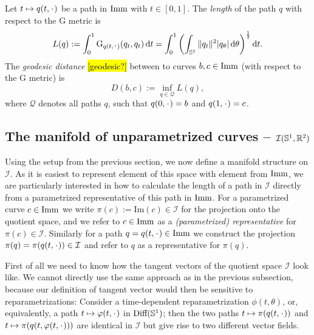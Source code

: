 \begin{definition}
  \label{def:length-in-imm}
  Let $t \mapsto q(t,\blank)$ be a path in $\I$ with $t \in [0,1]$. The \textit{length} of the path $q$ with respect to the $\mathrm{G}$ metric  is
  \begin{equation*}
    L(q) := \int_{0}^{1} \mathrm{G}_{q(t,\blank)}(q_t,q_t) \diff t =
    \int_{0}^{1}
    \left(
      \int_{\S^{1}} \|q_t\|^2 |q_{\theta}| \diff \theta
    \right)^{\frac{1}{2}}
    \diff t.
  \end{equation*}
  The \textit{geodesic distance} \hl{[geodesic?]} between to curves $b,c \in \I$ (with respect to the $\mathrm{G}$ metric) is
  \begin{equation*}
    D(b,c) := \inf_{q \in \mathcal{Q}} L(q),
  \end{equation*}
  where $\mathcal{Q}$ denotes all paths $q$, such that $q(0,\blank)=b$ and $q(1,\blank)=c$.
\end{definition}


\subsection{The manifold of unparametrized curves -- $\mathcal{I}(\S^1, \R^2)$}
\label{sec:manif-unpar-curv}

Using the setup from the previous section, we now define a manifold structure on $\mathcal{I}$. As it is easiest to represent element of this space with element from $\I$, we are particularly interested in how to calculate the length of a path in $\mathcal{I}$ directly from a parametrized representative of this path in $\I$. For a parametrized curve $c \in \I$ we write $\pi(c) := \mathrm{Im}(c)\in \mathcal{I}$ for the projection onto the quotient space, and we refer to $c\in\I$ as a \textit{(parametrized) representative} for $\pi(c) \in \mathcal{I}$. Similarly for a path $q = q(t, \blank) \in \I$ we construct the projection $\pi(q) = \pi(q(t,\blank)) \in \mathcal{I}$ and refer to $q$ as a representative for $\pi(q)$.

First of all we need to know how the tangent vectors of the quotient space $\mathcal{I}$ look like. We cannot directly use the same approach as in the previous subsection, because our definition of tangent vector would then be
sensitive to reparametrizations: Consider a time-dependent
reparametrization $\phi(t,\theta)$, or, equivalently, a path $t \mapsto \phi(t,
\blank)$ in $\text{Diff}(\S^1)$; then the two paths $t \mapsto
\pi(q(t, \blank))$ and $t \mapsto \pi(q(t, \phi(t, \blank)))$ are
identical in $\mathcal{I}$ but give rise to two different vector fields.

